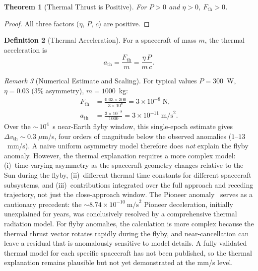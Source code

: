 \documentclass[12pt,a4paper]{article}
\newtheorem{theorem}{Theorem}[section]
\theoremstyle{definition}
\newtheorem{definition}[theorem]{Definition}
\theoremstyle{remark}
\newtheorem{remark}[theorem]{Remark}
\begin{document}
\begin{theorem}[Thermal Thrust is Positive]
\label{thm:thermal-pos}
For $P > 0$ and $\eta > 0$, $F_{\mathrm{th}} > 0$.
\end{theorem}

\begin{proof}
All three factors ($\eta$, $P$, $c$) are positive.
\end{proof}

\begin{definition}[Thermal Acceleration]
For a spacecraft of mass $m$, the thermal acceleration is
\begin{equation}
  a_{\mathrm{th}} = \frac{F_{\mathrm{th}}}{m}
  = \frac{\eta \, P}{m \, c}.
\end{equation}
\end{definition}

\begin{remark}[Numerical Estimate and Scaling]
For typical values $P = 300$~W, $\eta = 0.03$ (3\% asymmetry),
$m = 1000$~kg:
\begin{align}
  F_{\mathrm{th}} &= \frac{0.03 \times 300}{3 \times 10^8}
  = 3 \times 10^{-8}\;\mathrm{N}, \\
  a_{\mathrm{th}} &= \frac{3 \times 10^{-8}}{1000}
  = 3 \times 10^{-11}\;\mathrm{m/s}^2.
\end{align}
Over the ${\sim}\,10^4$~s near-Earth flyby window, this single-epoch
estimate gives $\Delta v_{\mathrm{th}} \sim 0.3\;\mu$m/s, four orders
of magnitude below the observed anomalies ($1$--$13$~mm/s).  A naive
uniform asymmetry model therefore does \emph{not} explain the flyby
anomaly.  However, the thermal explanation requires a more complex model:
(i)~time-varying asymmetry as the spacecraft geometry changes relative
to the Sun during the flyby, (ii)~different thermal time constants for
different spacecraft subsystems, and (iii)~contributions integrated over
the full approach and receding trajectory, not just the close-approach
window.  The Pioneer anomaly~\cite{Turyshev2012} serves as a cautionary
precedent: the $\sim 8.74 \times 10^{-10}~\mathrm{m/s}^2$ Pioneer
deceleration, initially unexplained for years, was conclusively resolved
by a comprehensive thermal radiation model.  For flyby anomalies, the
calculation is more complex because the thermal thrust vector rotates
rapidly during the flyby, and near-cancellation can leave a residual
that is anomalously sensitive to model details.  A fully validated
thermal model for each specific spacecraft has not been published, so
the thermal explanation remains plausible but not yet demonstrated at
the mm/s level.
\end{remark}
\end{document}

